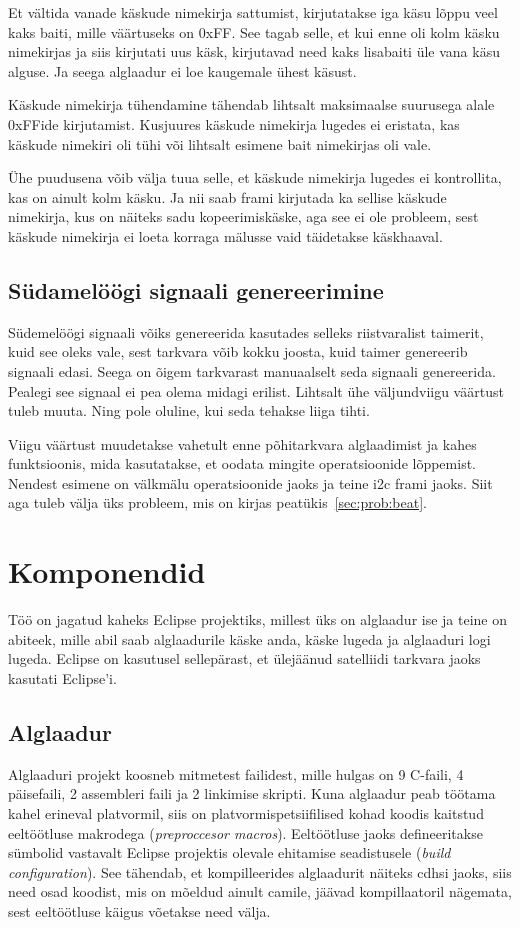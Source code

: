 \documentclass[12pt,a4paper]{article}
\begin{document}
Et vältida vanade käskude nimekirja sattumist, kirjutatakse iga käsu lõppu veel
kaks baiti, mille väärtuseks on 0xFF. See tagab selle, et kui enne oli kolm
käsku nimekirjas ja siis kirjutati uus käsk, kirjutavad need kaks lisabaiti üle
vana käsu alguse. Ja seega alglaadur ei loe kaugemale ühest käsust.

Käskude nimekirja tühendamine tähendab lihtsalt maksimaalse suurusega alale
0xFFide kirjutamist. Kusjuures käskude nimekirja lugedes ei eristata, kas
käskude nimekiri oli tühi või lihtsalt esimene bait nimekirjas oli vale.

Ühe puudusena võib välja tuua selle, et käskude nimekirja lugedes ei
kontrollita, kas on ainult kolm käsku. Ja nii saab \gls{fram}i kirjutada ka sellise
käskude nimekirja, kus on näiteks sadu kopeerimiskäske, aga see ei ole probleem,
sest käskude nimekirja ei loeta korraga mälusse vaid täidetakse käskhaaval.


\subsection{Südamelöögi signaali genereerimine}
Südemelöögi signaali võiks genereerida kasutades selleks riistvaralist taimerit,
kuid see oleks vale, sest tarkvara võib kokku joosta, kuid taimer genereerib
signaali edasi. Seega on õigem tarkvarast manuaalselt seda signaali genereerida.
Pealegi see signaal ei pea olema midagi erilist. Lihtsalt ühe väljundviigu
väärtust tuleb muuta. Ning pole oluline, kui seda tehakse liiga tihti.

Viigu väärtust muudetakse vahetult enne põhitarkvara alglaadimist ja kahes
funktsioonis, mida kasutatakse, et oodata mingite operatsioonide lõppemist.
Nendest esimene on välkmälu operatsioonide jaoks ja teine \gls{i2c} \gls{fram}i jaoks. Siit
aga tuleb välja üks probleem, mis on kirjas peatükis~\ref{sec:prob:beat}. 

\section{Komponendid}
Töö on jagatud kaheks Eclipse projektiks, millest üks on alglaadur ise ja teine on
abiteek, mille abil saab alglaadurile käske anda, käske lugeda ja alglaaduri
logi lugeda. Eclipse on kasutusel sellepärast, et ülejäänud satelliidi tarkvara jaoks
kasutati Eclipse'i. 

\subsection{Alglaadur}
Alglaaduri projekt koosneb mitmetest failidest, mille hulgas on 9 C-faili, 4
päisefaili, 2 assembleri faili ja 2 linkimise skripti. Kuna alglaadur peab töötama kahel erineval
platvormil, siis on platvormispetsiifilised kohad koodis kaitstud eeltöötluse
makrodega (\textit{preproccesor macros}). Eeltöötluse jaoks defineeritakse
sümbolid vastavalt Eclipse projektis olevale ehitamise seadistusele
(\textit{build configuration}). See tähendab, et kompilleerides alglaadurit
näiteks \gls{cdhs}i jaoks, siis need osad koodist, mis on mõeldud ainult \gls{cam}ile,
jäävad kompillaatoril nägemata, sest eeltöötluse käigus võetakse need välja.
\end{document}
